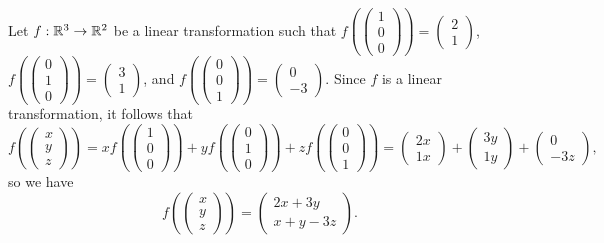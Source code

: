 \begin{exmp}
    Let $f: \mathbb{R}^3 \to \mathbb{R}^2$ be a linear transformation such that $f\left(\begin{pmatrix}
        1 \\ 0 \\ 0
    \end{pmatrix}\right) = \begin{pmatrix}
        2 \\ 1
    \end{pmatrix}$, $f\left(\begin{pmatrix}
        0 \\ 1 \\ 0
    \end{pmatrix}\right) = \begin{pmatrix}
        3 \\ 1
    \end{pmatrix}$, and $f\left(\begin{pmatrix}
        0 \\ 0 \\ 1
    \end{pmatrix}\right) = \begin{pmatrix}
        0 \\ -3
    \end{pmatrix}$. Since $f$ is a linear transformation, it follows that \[f\left(\begin{pmatrix}
        x \\ y \\ z
    \end{pmatrix}\right) = xf\left(\begin{pmatrix}
        1 \\ 0 \\ 0
    \end{pmatrix}\right) + yf\left(\begin{pmatrix}
        0 \\ 1 \\ 0
    \end{pmatrix}\right) + zf\left(\begin{pmatrix}
        0 \\ 0 \\ 1
    \end{pmatrix}\right) = \begin{pmatrix}
        2x \\ 1x
    \end{pmatrix} + \begin{pmatrix}
        3y \\ 1y
    \end{pmatrix} + \begin{pmatrix}
        0 \\ -3z
    \end{pmatrix},\] so we have \[f\left(\begin{pmatrix}
        x \\ y \\ z
    \end{pmatrix}\right) = \begin{pmatrix}
        2x + 3y \\ x + y - 3z
    \end{pmatrix}.\]
\end{exmp}

